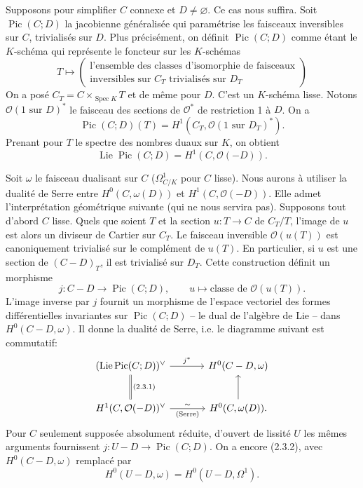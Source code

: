 \documentclass[11pt,leqno]{article}
\DeclareMathOperator{\Spec}{Spec}
\DeclareMathOperator{\Lie}{Lie}
\DeclareMathOperator{\Pic}{Pic}
\newcommand{\OO}{\mathcal O}
\begin{document}
Supposons pour simplifier $C$ connexe et $D\ne\varnothing$. Ce cas nous suffira. Soit $\Pic(C;D)$ la jacobienne généralisée qui paramétrise les faisceaux inversibles sur $C$, trivialisés sur $D$. Plus précisément, on définit $\Pic(C;D)$ comme étant le $K$-schéma qui représente le foncteur sur les $K$-schémas
\[
T\longmapsto
\left(\begin{gathered}
\text{l'ensemble des classes d'isomorphie de faisceaux}\\
\text{inversibles sur $C_T$ trivialisés sur $D_T$}
\end{gathered}\right)
\]
On a posé $C_T=C\times_{\Spec K}T$ et de même pour $D$. C'est un $K$-schéma lisse. Notons $\OO(1\text{ sur }D)^*$ le faisceau des sections de $\OO^*$ de restriction 1 à $D$. On a
\[
        \Pic(C;D)(T)=H^1(C_T,\OO(1\text{ sur }D_T)^*).
\]
Prenant pour $T$ le spectre des nombres duaux sur $K$, on obtient
\begin{equation}
        \Lie\Pic(C;D)=H^1(C,\OO(-D)). \tag{2.3.1}
\end{equation}

Soit $\omega$ le faisceau dualisant sur $C$ ($\Omega^1_{C/K}$ pour $C$ lisse). Nous aurons à utiliser la dualité de Serre entre $H^0(C,\omega(D))$ et $H^1(C,\OO(-D))$. Elle admet l'interprétation géométrique suivante (qui ne nous servira pas). Supposons tout d'abord $C$ lisse. Quels que soient $T$ et la section $u:T\to C$ de $C_T/T$, l'image de $u$ est alors un diviseur de Cartier sur $C_T$. Le faisceau inversible $\OO(u(T))$ est canoniquement trivialisé sur le complément de $u(T)$. En particulier, si $u$ est une section de $(C-D)_T$, il est trivialisé sur $D_T$. Cette construction définit un morphisme
\begin{equation}
        j:C-D\longrightarrow\Pic(C;D),\qquad u\longmapsto\text{classe de }\OO(u(T)). \tag{2.3.2}
\end{equation}
L'image inverse par $j$ fournit un morphisme de l'espace vectoriel des formes différentielles invariantes sur $\Pic(C;D)$ -- le dual de l'algèbre de Lie -- dans $H^0(C-D,\omega)$. Il donne la dualité de Serre, i.e. le diagramme suivant est commutatif:
\[
\begin{tikzcd}[column sep=3.5em,row sep=2.5em]
(\Lie\Pic(C;D))^{\vee} \arrow[r,"j^*"] \arrow[d,equal,"{(2.3.1)}"] & H^0(C-D,\omega) \\
H^1(C,\OO(-D))^{\vee} \arrow[r,"\sim","{\text{(Serre)}}"'] & H^0(C,\omega(D)). \arrow[u]
\end{tikzcd}
\]
\clearpage
Pour $C$ seulement supposée absolument réduite, d'ouvert de lissité $U$ les mêmes arguments fournissent $j:U-D\longrightarrow\Pic(C;D)$. On a encore (2.3.2), avec $H^0(C-D,\omega)$ remplacé par
\[
        H^0(U-D,\omega)=H^0(U-D,\Omega^1).
\]
\end{document}
